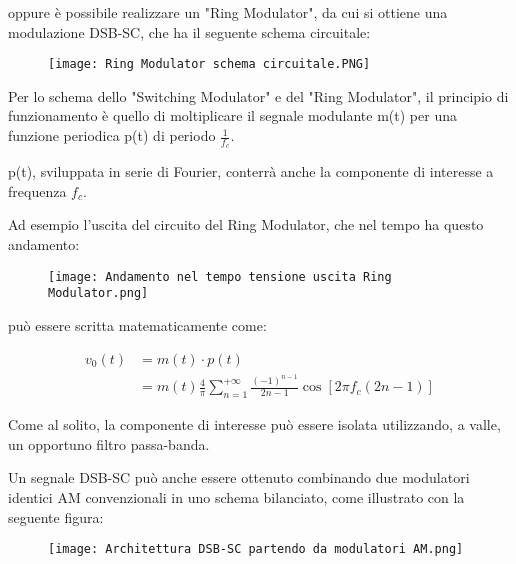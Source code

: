oppure è possibile realizzare un "Ring Modulator", da cui si ottiene una modulazione DSB-SC, 
che ha il seguente schema circuitale: 

\begin{figure}[h]
    \centering
    \texttt{[image: Ring Modulator schema circuitale.PNG]}
\end{figure} 

Per lo schema dello "Switching Modulator" e del "Ring Modulator", 
il principio di funzionamento è quello di moltiplicare il segnale modulante m(t) per una funzione periodica p(t) di periodo $\frac{1}{f_c}$. \newline 

p(t), sviluppata in serie di Fourier, conterrà anche la componente di interesse a frequenza $f_c$. \newline 

Ad esempio l'uscita del circuito del Ring Modulator, che nel tempo ha questo andamento: 

\begin{figure}[h]
    \centering
    \texttt{[image: Andamento nel tempo tensione uscita Ring Modulator.png]}
\end{figure} 


può essere scritta matematicamente come: 

{
    \Large 
    \begin{equation}
        \begin{split}
            v_0 (t) 
            &= 
            m(t) \cdot p(t)
            \\
            &= 
            m(t)
            \frac{4}{\pi} 
            \sum_{n = 1}^{+ \infty}
            \frac{(-1)^{n-1}}{2n - 1 }
            \cos [2 \pi f_c (2n - 1)]
        \end{split}
    \end{equation}
}

Come al solito, la componente di interesse può essere isolata utilizzando, a valle, un opportuno filtro passa-banda. \newline 

Un segnale DSB-SC può anche essere ottenuto combinando due modulatori identici AM convenzionali in uno schema bilanciato, come illustrato con la seguente figura: 

\begin{figure}[h]
    \centering
    \texttt{[image: Architettura DSB-SC partendo da modulatori AM.png]}
\end{figure} 

